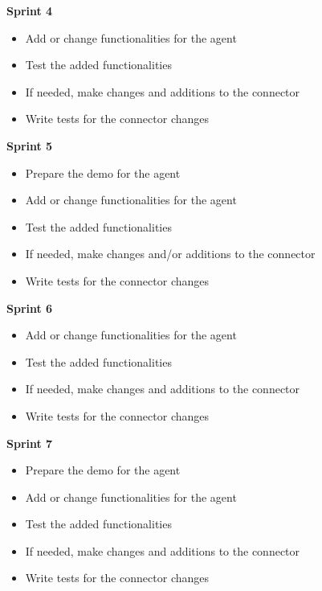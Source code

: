 \textbf{Sprint 4}

\begin{itemize}
  \item Add or change functionalities for the agent
  \item Test the added functionalities
  \item If needed, make changes and additions to the connector
  \item Write tests for the connector changes\\
\end{itemize}

\textbf{Sprint 5}

\begin{itemize}
  \item Prepare the demo for the agent
  \item Add or change functionalities for the agent
  \item Test the added functionalities
  \item If needed, make changes and/or additions to the connector
  \item Write tests for the connector changes\\
\end{itemize}

\textbf{Sprint 6}

\begin{itemize}
  \item Add or change functionalities for the agent
  \item Test the added functionalities
  \item If needed, make changes and additions to the connector
  \item Write tests for the connector changes\\
\end{itemize}

\textbf{Sprint 7}

\begin{itemize}
  \item Prepare the demo for the agent
  \item Add or change functionalities for the agent
  \item Test the added functionalities
  \item If needed, make changes and additions to the connector
  \item Write tests for the connector changes\\\\\\
\end{itemize}

